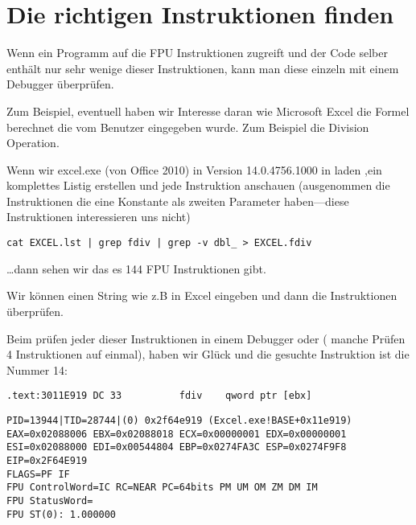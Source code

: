 \section{Die richtigen Instruktionen finden}

Wenn ein Programm auf die FPU Instruktionen zugreift und der Code selber enth\"alt nur sehr wenige
dieser Instruktionen, kann man diese einzeln mit einem Debugger \"uberpr\"ufen.

\par Zum Beispiel, eventuell haben wir Interesse daran wie Microsoft Excel die Formel berechnet die vom Benutzer eingegeben wurde.
Zum Beispiel die Division Operation.

\myindex{\GrepUsage}

Wenn wir excel.exe (von Office 2010) in Version 14.0.4756.1000 in \IDA laden ,ein komplettes
Listig erstellen und jede \FDIV Instruktion anschauen (ausgenommen die Instruktionen die
eine Konstante als zweiten Parameter haben---diese Instruktionen interessieren uns nicht)

\begin{lstlisting}
cat EXCEL.lst | grep fdiv | grep -v dbl_ > EXCEL.fdiv
\end{lstlisting}

\dots dann sehen wir das es 144 FPU Instruktionen gibt.

\par Wir k\"onnen einen String wie z.B  in Excel eingeben und dann die Instruktionen \"uberpr\"ufen.


\par Beim pr\"ufen jeder dieser Instruktionen in einem Debugger oder \tracer
( manche Pr\"ufen 4 Instruktionen auf einmal), haben wir Gl\"uck und die
gesuchte Instruktion ist die Nummer 14:

\begin{lstlisting}[style=customasmx86]
.text:3011E919 DC 33          fdiv    qword ptr [ebx]
\end{lstlisting}

\begin{lstlisting}
PID=13944|TID=28744|(0) 0x2f64e919 (Excel.exe!BASE+0x11e919)
EAX=0x02088006 EBX=0x02088018 ECX=0x00000001 EDX=0x00000001
ESI=0x02088000 EDI=0x00544804 EBP=0x0274FA3C ESP=0x0274F9F8
EIP=0x2F64E919
FLAGS=PF IF
FPU ControlWord=IC RC=NEAR PC=64bits PM UM OM ZM DM IM 
FPU StatusWord=
FPU ST(0): 1.000000
\end{lstlisting}

